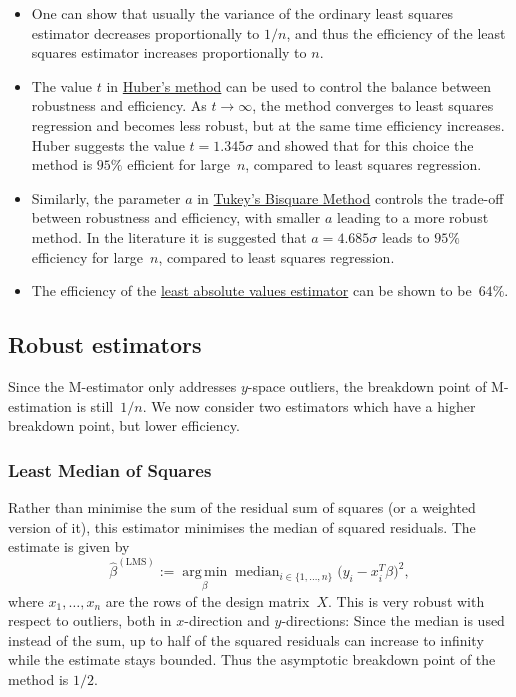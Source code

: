 \documentclass[
  a4paper,
]{article}
\theoremstyle{definition}
\theoremstyle{definition}
\theoremstyle{definition}
\theoremstyle{definition}
\theoremstyle{remark}
\begin{document}
\begin{itemize}
\item
  One can show that usually the variance of the ordinary least squares
  estimator decreases proportionally to \(1 / n\), and thus the efficiency of
  the least squares estimator increases proportionally to \(n\).
\item
  The value \(t\) in \protect\hyperlink{Huber}{Huber's method} can be used to control
  the balance between robustness and efficiency. As \(t\to\infty\),
  the method converges to least squares regression and becomes
  less robust, but at the same time efficiency increases.
  Huber suggests the value \(t = 1.345\sigma\) and showed that for this
  choice the method is \(95\%\) efficient for large~\(n\), compared
  to least squares regression.
\item
  Similarly, the parameter \(a\) in \protect\hyperlink{tukeys-bisquare-method}{Tukey's Bisquare Method} controls
  the trade-off between robustness and efficiency, with smaller \(a\) leading
  to a more robust method. In the literature it is suggested that
  \(a = 4.685 \sigma\) leads to \(95\%\) efficiency for large~\(n\), compared to
  least squares regression.
\item
  The efficiency of the \protect\hyperlink{LAV}{least absolute values estimator} can be shown
  to be~\(64\%\).
\end{itemize}

\hypertarget{robust-estimators}{%
\subsection{Robust estimators}\label{robust-estimators}}

Since the M-estimator only addresses \(y\)-space outliers, the breakdown point
of M-estimation is still~\(1/n\). We now consider two estimators which have a
higher breakdown point, but lower efficiency.

\hypertarget{least-median-of-squares}{%
\subsubsection{Least Median of Squares}\label{least-median-of-squares}}

Rather than minimise the sum of the residual sum of squares (or a weighted
version of it), this estimator minimises the median of squared residuals. The
estimate is given by
\begin{equation*}
  \hat\beta^\mathrm{(LMS)}
  := \mathop{\mathrm{arg\,min}}\limits_\beta \mathop{\mathrm{median}}_{i\in\{1,\ldots,n\}} \bigl( y_i- x_i^T \beta \bigr)^2,
\end{equation*}
where \(x_1, \ldots, x_n\) are the rows of the design matrix~\(X\).
This is very robust with respect to outliers, both in \(x\)-direction and
\(y\)-directions: Since the median is used instead of the sum, up to half
of the squared residuals can increase to infinity while the estimate stays
bounded. Thus the asymptotic breakdown point of the method is \(1/2\).
\end{document}
